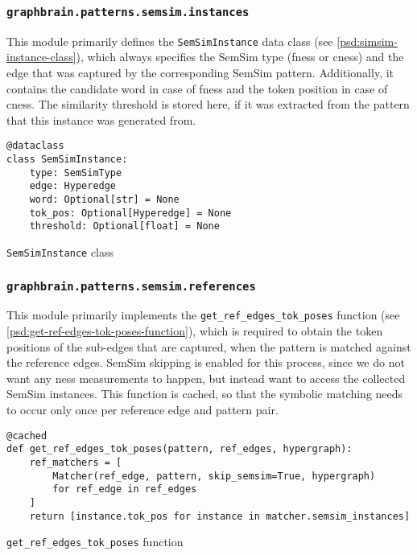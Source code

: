 \documentclass[11pt]{scrreprt}
\begin{document}
\subsubsection{\texttt{graphbrain.patterns.semsim.instances}}

This module primarily defines the \texttt{SemSimInstance} data class (see \cref{psd:simsim-instance-class}), which always specifies the SemSim type (\gls{fness} or \gls{cness}) and the edge that was captured by the corresponding SemSim pattern. Additionally, it contains the candidate word in case of \gls{fness} and the token position in case of \gls{cness}. The similarity threshold is stored here, if it was extracted from the pattern that this instance was generated from.

\begin{pseudo}
\begin{lstlisting}
@dataclass
class SemSimInstance:
    type: SemSimType
    edge: Hyperedge
    word: Optional[str] = None
    tok_pos: Optional[Hyperedge] = None
    threshold: Optional[float] = None
\end{lstlisting}
\label{psd:simsim-instance-class}
\caption{\texttt{SemSimInstance} class}
\end{pseudo}

\subsubsection{\texttt{graphbrain.patterns.semsim.references}}
\label{sec:graphbrain.patterns.semsim.references}
This module primarily implements the \texttt{get\_ref\_edges\_tok\_poses} function (see \cref{psd:get-ref-edges-tok-poses-function}), which is required to obtain the token positions of the sub-edges that are captured, when the pattern is matched against the reference edges. SemSim skipping is enabled for this process, since we do not want any \gls{ness} measurements to happen, but instead  want to access the collected SemSim instances.  This function is cached, so that the symbolic matching needs to occur only once per reference edge and pattern pair.


\begin{pseudo}
\begin{lstlisting}
@cached
def get_ref_edges_tok_poses(pattern, ref_edges, hypergraph):
    ref_matchers = [
        Matcher(ref_edge, pattern, skip_semsim=True, hypergraph)
        for ref_edge in ref_edges
    ]
    return [instance.tok_pos for instance in matcher.semsim_instances]
\end{lstlisting}
\caption{\texttt{get\_ref\_edges\_tok\_poses} function}
\label{psd:get-ref-edges-tok-poses-function}
\end{pseudo}
\end{document}

